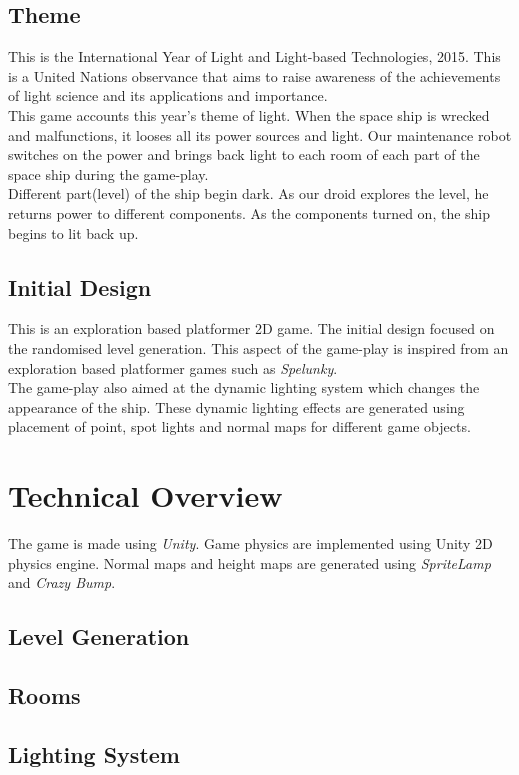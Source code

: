 \documentclass[11pt]{article}
\begin{document}
\subsection{Theme}
This is the International Year of Light and Light-based Technologies, 2015. This is a United Nations observance that aims to raise awareness of the achievements of light science and its applications and importance.\\

This game accounts this year's theme of light. When the space ship is wrecked and malfunctions, it looses all its power sources and light. Our maintenance robot switches on the power and brings back light to each room of each part of the space ship during the game-play.\\

Different part(level) of the ship begin dark. As our droid explores the level, he returns power to different components. As the components turned on, the ship begins to lit back up. 
\subsection{Initial Design}
This is an exploration based platformer 2D game. The initial design focused on the randomised level generation. This aspect of the game-play is inspired from an exploration based platformer games such as \textit{Spelunky}.\\

The game-play also aimed at the dynamic lighting system which changes the appearance of the ship. These dynamic lighting effects are generated  using placement of point, spot lights and normal maps for different game objects.
\section{Technical Overview}
The game is made using \textit{Unity}. Game physics are implemented using Unity 2D physics engine. Normal maps and height maps are generated using \textit{SpriteLamp} and \textit{Crazy Bump}.
\subsection{Level Generation}

\subsection{Rooms}
\subsection{Lighting System}
\end{document}
